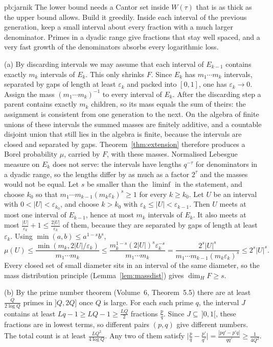 \begin{solution}{pb:jarnik}
\idea The lower bound needs a Cantor set inside $W(\tau)$ that is as thick as the upper bound allows. Build it greedily. Inside each interval of the previous generation, keep a small interval about every fraction with a much larger denominator. Primes in a dyadic range give fractions that stay well spaced, and a very fast growth of the denominators absorbs every logarithmic loss.

\writeup (a) By discarding intervals we may assume that each interval of $E_{k-1}$ contains exactly $m_k$ intervals of $E_k$. This only shrinks $F$. Since $E_k$ has $m_1\cdots m_k$ intervals, separated by gaps of length at least $\varepsilon_k$ and packed into $[0,1]$, one has $\varepsilon_k\to 0$. Assign the mass $(m_1\cdots m_k)^{-1}$ to every interval of $E_k$. After the discarding step a parent contains exactly $m_k$ children, so its mass equals the sum of theirs: the assignment is consistent from one generation to the next. On the algebra of finite unions of these intervals the summed masses are finitely additive, and a countable disjoint union that still lies in the algebra is finite, because the intervals are closed and separated by gaps. Theorem~\ref{thm:extension} therefore produces a Borel probability $\mu$, carried by $F$, with these masses. Normalised Lebesgue measure on $E_k$ does not serve: the intervals have lengths $q^{-\tau}$ for denominators in a dyadic range, so the lengths differ by as much as a factor $2^\tau$ and the masses would not be equal. Let $s$ be smaller than the $\liminf$ in the statement, and choose $k_0$ so that $m_1\cdots m_{k-1}(m_k\varepsilon_k)^s\ge 1$ for every $k\ge k_0$. Let $U$ be an interval with $0<|U|<\varepsilon_{k_0}$, and choose $k>k_0$ with $\varepsilon_k\le|U|<\varepsilon_{k-1}$. Then $U$ meets at most one interval of $E_{k-1}$, hence at most $m_k$ intervals of $E_k$. It also meets at most $\frac{|U|}{\varepsilon_k}+1\le\frac{2|U|}{\varepsilon_k}$ of them, because they are separated by gaps of length at least $\varepsilon_k$. Using $\min(a,b)\le a^{1-s}b^s$,
\[
\mu(U)\le\frac{\min(m_k,2|U|/\varepsilon_k)}{m_1\cdots m_k}\le\frac{m_k^{1-s}(2|U|)^s\varepsilon_k^{-s}}{m_1\cdots m_k}=\frac{2^s|U|^s}{m_1\cdots m_{k-1}(m_k\varepsilon_k)^s}\le 2^s|U|^s.
\]
Every closed set of small diameter sits in an interval of the same diameter, so the mass distribution principle (Lemma~\ref{lem:massdist}) gives $\dim_HF\ge s$.

(b) By the prime number theorem (Volume~6, Theorem~5.5) there are at least $\frac{Q}{2\log Q}$ primes in $]Q,2Q]$ once $Q$ is large. For each such prime $q$, the interval $J$ contains at least $Lq-1\ge LQ-1\ge\frac{LQ}2$ fractions $\frac pq$. Since $J\subseteq\,]0,1[$, these fractions are in lowest terms, so different pairs $(p,q)$ give different numbers. The total count is at least $\frac{LQ^2}{4\log Q}$. Any two of them satisfy $\bigl|\frac pq-\frac{p'}{q'}\bigr|=\frac{|pq'-p'q|}{qq'}\ge\frac1{4Q^2}$.


\end{solution}
